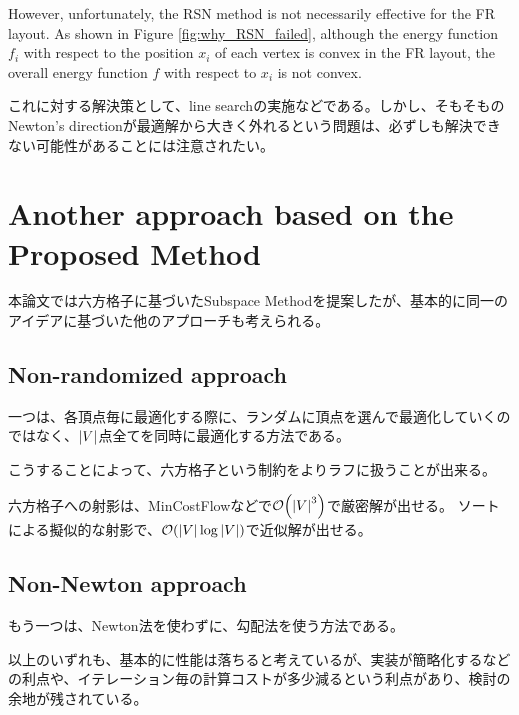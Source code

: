 \documentclass[dvipdfmx,journal]{IEEEtran}
\begin{document}
However, unfortunately, the RSN method is not necessarily effective for the FR layout.
As shown in Figure \ref{fig:why_RSN_failed}, although the energy function \( f_i \) with respect to the position \( x_i \) of each vertex is convex in the FR layout, the overall energy function \( f \) with respect to \( x_i \) is not convex.

これに対する解決策として、line searchの実施などである。しかし、そもそものNewton's directionが最適解から大きく外れるという問題は、必ずしも解決できない可能性があることには注意されたい。

\section{Another approach based on the Proposed Method}\label{sec:anotherApproach}

本論文では六方格子に基づいたSubspace Methodを提案したが、基本的に同一のアイデアに基づいた他のアプローチも考えられる。

\subsection{Non-randomized approach}\label{ssec:nonRandom}
一つは、各頂点毎に最適化する際に、ランダムに頂点を選んで最適化していくのではなく、$\abs{V}$点全てを同時に最適化する方法である。

こうすることによって、六方格子という制約をよりラフに扱うことが出来る。

六方格子への射影は、MinCostFlowなどで$\order{\abs{V}^3}$で厳密解が出せる。
ソートによる擬似的な射影で、$\order{\abs{V} \log \abs{V}}$で近似解が出せる。

\subsection{Non-Newton approach}\label{ssec:nonNewton}

もう一つは、Newton法を使わずに、勾配法を使う方法である。

以上のいずれも、基本的に性能は落ちると考えているが、実装が簡略化するなどの利点や、イテレーション毎の計算コストが多少減るという利点があり、検討の余地が残されている。
\end{document}
